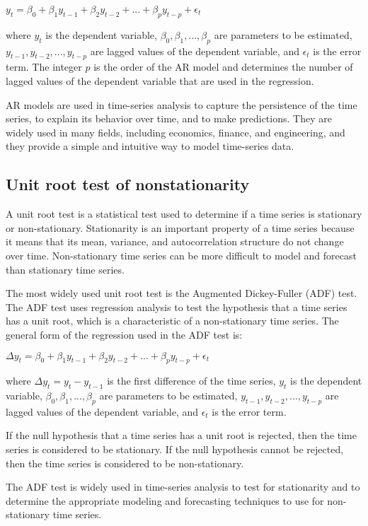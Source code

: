 \documentclass[12pt, a4paper, oneside]{article}
\begin{document}
$y_t = \beta_0 + \beta_1 y_{t-1} + \beta_2 y_{t-2} + ... + \beta_p y_{t-p} + \epsilon_t$

where $y_t$ is the dependent variable, $\beta_0, \beta_1, ..., \beta_p$ are parameters to be estimated, $y_{t-1}, y_{t-2}, ..., y_{t-p}$ are lagged values of the dependent variable, and $\epsilon_t$ is the error term. The integer $p$ is the order of the AR model and determines the number of lagged values of the dependent variable that are used in the regression.

AR models are used in time-series analysis to capture the persistence of the time series, to explain its behavior over time, and to make predictions. They are widely used in many fields, including economics, finance, and engineering, and they provide a simple and intuitive way to model time-series data.

\subsection{ Unit root test of nonstationarity }
A unit root test is a statistical test used to determine if a time series is stationary or non-stationary. Stationarity is an important property of a time series because it means that its mean, variance, and autocorrelation structure do not change over time. Non-stationary time series can be more difficult to model and forecast than stationary time series.

The most widely used unit root test is the Augmented Dickey-Fuller (ADF) test. The ADF test uses regression analysis to test the hypothesis that a time series has a unit root, which is a characteristic of a non-stationary time series. The general form of the regression used in the ADF test is:

$\Delta y_t = \beta_0 + \beta_1 y_{t-1} + \beta_2 y_{t-2} + ... + \beta_p y_{t-p} + \epsilon_t$

where $\Delta y_t = y_t - y_{t-1}$ is the first difference of the time series, $y_t$ is the dependent variable, $\beta_0, \beta_1, ..., \beta_p$ are parameters to be estimated, $y_{t-1}, y_{t-2}, ..., y_{t-p}$ are lagged values of the dependent variable, and $\epsilon_t$ is the error term.

If the null hypothesis that a time series has a unit root is rejected, then the time series is considered to be stationary. If the null hypothesis cannot be rejected, then the time series is considered to be non-stationary.

The ADF test is widely used in time-series analysis to test for stationarity and to determine the appropriate modeling and forecasting techniques to use for non-stationary time series.
\end{document}
